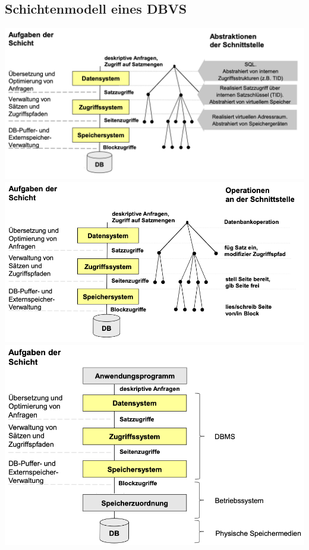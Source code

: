 \subsection{Schichtenmodell eines DBVS}
\begin{center}
	\includegraphics[scale=0.5]{images/Schichtenmodell_Aufgaben.png}
\includegraphics[scale=0.5]{images/Schichtenmodell_Operationen.png}
\includegraphics[scale=0.5]{images/Schichtenmodell_Abstraktion.png}
\end{center}
